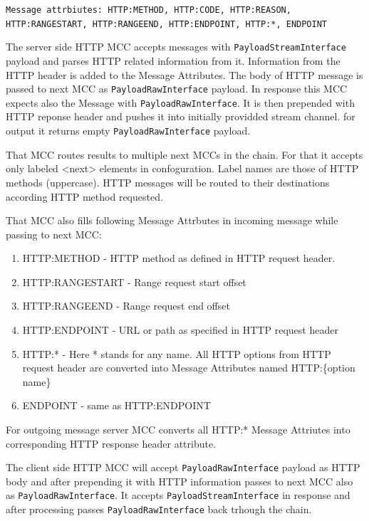 \documentclass{book}
\begin{document}
\texttt{Message attrbiutes: HTTP:METHOD, HTTP:CODE, HTTP:REASON, HTTP:RANGESTART, HTTP:RANGEEND, HTTP:ENDPOINT, HTTP:*, ENDPOINT}


The server side HTTP MCC accepts messages with \texttt{PayloadStreamInterface} payload and parses HTTP related information from it. Information from the HTTP header is added to the Message Attributes. The body of HTTP message is passed to next MCC as \texttt{PayloadRawInterface} payload. In response this MCC expects also the Message with \texttt{PayloadRawInterface}. It is then prepended with HTTP reponse header and pushes it into initially providded stream channel. for output it returns empty \texttt{PayloadRawInterface} payload.

That MCC routes results to multiple next MCCs in the chain. For that it accepts only labeled <next> elements in confoguration. Label names are those of HTTP methods (uppercase). HTTP messages will be routed to their destinations according HTTP method requested.

That MCC also fills following Message Attrbutes in incoming message while passing to next MCC:
\begin{enumerate}

\item HTTP:METHOD - HTTP method as defined in HTTP request header.

\item HTTP:RANGESTART - Range request start offset

\item HTTP:RANGEEND - Range request end offset

\item HTTP:ENDPOINT - URL or path as specified in HTTP request header

\item HTTP:* - Here * stands for any name. All HTTP options from HTTP request header are converted into Message Attributes named HTTP:\{option name\}

\item ENDPOINT - same as HTTP:ENDPOINT

\end{enumerate}

For outgoing message server MCC converts all HTTP:* Message Attriutes into corresponding HTTP response header attribute.

The client side HTTP MCC will accept \texttt{PayloadRawInterface} payload as HTTP body and after prepending it with HTTP information passes to next MCC also as \texttt{PayloadRawInterface}. It accepts \texttt{PayloadStreamInterface} in response and after processing passes \texttt{PayloadRawInterface} back trhough the chain.
\end{document}

